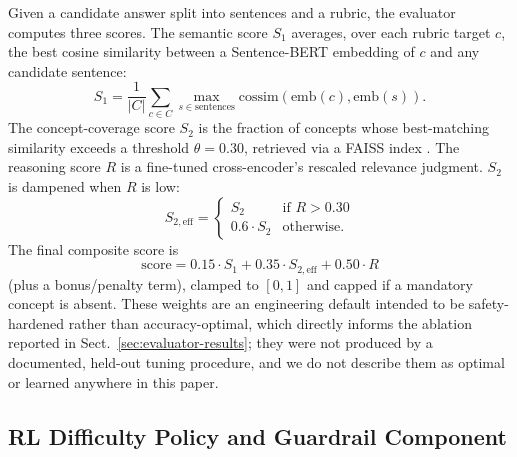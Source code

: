 \documentclass[runningheads]{llncs}
\begin{document}
Given a candidate answer split into sentences and a rubric, the evaluator computes three scores. The semantic score $S_1$ averages, over each rubric target $c$, the best cosine similarity between a Sentence-BERT \cite{key7} embedding of $c$ and any candidate sentence:
\begin{equation}
S_1 = \frac{1}{|C|}\sum_{c \in C} \max_{s \in \text{sentences}} \mathrm{cossim}(\mathrm{emb}(c), \mathrm{emb}(s)).
\end{equation}
The concept-coverage score $S_2$ is the fraction of concepts whose best-matching similarity exceeds a threshold $\theta = 0.30$, retrieved via a FAISS index \cite{key8}. The reasoning score $R$ is a fine-tuned cross-encoder's rescaled relevance judgment. $S_2$ is dampened when $R$ is low:
\begin{equation}
S_{2,\mathrm{eff}} = \begin{cases} S_2 & \text{if } R > 0.30 \\ 0.6 \cdot S_2 & \text{otherwise.} \end{cases}
\end{equation}
The final composite score is
\begin{equation}
\mathrm{score} = 0.15 \cdot S_1 + 0.35 \cdot S_{2,\mathrm{eff}} + 0.50 \cdot R
\label{eq:composite}
\end{equation}
(plus a bonus/penalty term), clamped to $[0,1]$ and capped if a mandatory concept is absent. These weights are an engineering default intended to be safety-hardened rather than accuracy-optimal, which directly informs the ablation reported in Sect.~\ref{sec:evaluator-results}; they were not produced by a documented, held-out tuning procedure, and we do not describe them as optimal or learned anywhere in this paper.

\subsection{RL Difficulty Policy and Guardrail Component}
\end{document}

